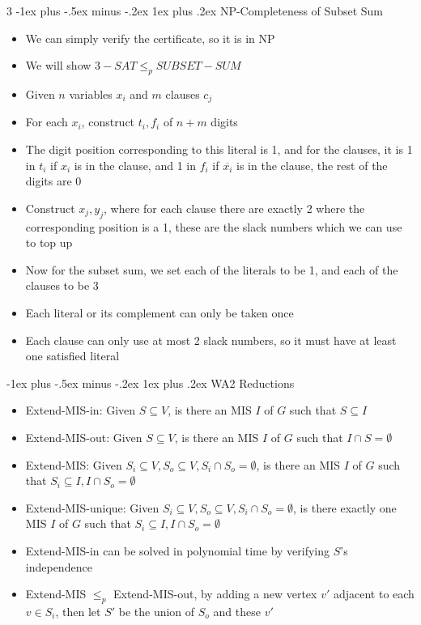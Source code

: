 \documentclass[10pt, landscape]{article}
\makeatletter
\renewcommand{\subsection}{\@startsection{subsection}{3}{0mm}%
                                {-1ex plus -.5ex minus -.2ex}%
                                {1ex plus .2ex}%
                                {\normalfont\small\bfseries}}%
\makeatother
\begin{document}
\begin{multicols*}{3}
\subsection{NP-Completeness of Subset Sum}
\begin{itemize}
    \item We can simply verify the certificate, so it is in NP
    \item We will show $3-SAT \leq_p SUBSET-SUM$
    \item Given $n$ variables $x_i$ and $m$ clauses $c_j$
    \item For each $x_i$, construct $t_i, f_i$ of $n+m$ digits
    \item The digit position corresponding to this literal is 1, and for the clauses, it is 1 in $t_i$ if $x_i$ is in the clause, and 1 in $f_i$ if $\overline{x_i}$ is in the clause, the rest of the digits are 0
    \item Construct $x_j, y_j$, where for each clause there are exactly 2 where the corresponding position is a 1, these are the slack numbers which we can use to top up
    \item Now for the subset sum, we set each of the literals to be 1, and each of the clauses to be 3
    \item Each literal or its complement can only be taken once
    \item Each clause can only use at most 2 slack numbers, so it must have at least one satisfied literal
\end{itemize}

\subsection{WA2 Reductions}
\begin{itemize}
    \item Extend-MIS-in: Given $S \subseteq V$, is there an MIS $I$ of $G$ such that $S \subseteq I$
    \item Extend-MIS-out: Given $S \subseteq V$, is there an MIS $I$ of $G$ such that $I \cap S = \emptyset$
    \item Extend-MIS: Given $S_i \subseteq V, S_o \subseteq V, S_i \cap S_o = \emptyset$, is there an MIS $I$ of $G$ such that $S_i \subseteq I, I \cap S_o = \emptyset$
    \item Extend-MIS-unique: Given $S_i \subseteq V, S_o \subseteq V, S_i \cap S_o = \emptyset$, is there exactly one MIS $I$ of $G$ such that $S_i \subseteq I, I \cap S_o = \emptyset$
    \item Extend-MIS-in can be solved in polynomial time by verifying $S$'s independence
    \item Extend-MIS $\leq_p$ Extend-MIS-out, by adding a new vertex $v'$ adjacent to each $v \in S_i$, then let $S'$ be the union of $S_o$ and these $v'$
\end{itemize}


\end{multicols*}
\end{document}
